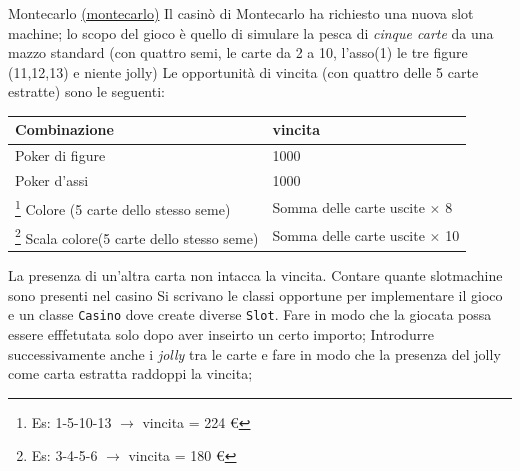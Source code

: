 \begin{esercizio}{Montecarlo \href{run:./files/java/esercizi/montecarlo/}{(montecarlo)}}
	Il casinò di Montecarlo ha richiesto una nuova slot machine; lo scopo del gioco è quello di simulare la pesca di \textit{cinque carte} da una mazzo standard (con quattro semi, le carte da 2 a 10, l’asso(1) le tre figure (11,12,13) e niente jolly)
	\vskip3mm
	Le opportunità di vincita (con quattro delle 5 carte estratte) sono le seguenti:
	\begin{center}
		\begin{tabular}{l l}
			\toprule
			Combinazione                                                                                    & vincita                                 \\
			\midrule
			Poker di figure                                                                                 & 1000 \texteuro                          \\
			Poker d’assi                                                                                    & 1000 \texteuro                          \\
			\footnote{Es: 1-5-10-13 $ \rightarrow  $ vincita = 224 €} Colore (5 carte dello stesso seme)    & Somma delle carte uscite $ \times  $ 8  \\
			\footnote{Es: 3-4-5-6 $ \rightarrow  $ vincita = 180 €} Scala colore(5 carte dello stesso seme) & Somma delle carte uscite $ \times  $ 10 \\
			\bottomrule
		\end{tabular}
	\end{center}


	La presenza di un’altra carta non intacca la vincita.
	\vskip3mm
	Contare quante slotmachine sono presenti nel casino
	\vskip3mm
	Si scrivano le classi opportune per implementare il gioco e un classe \verb|Casino| dove create diverse \verb|Slot|.
	\vskip3mm
	Fare in modo che la giocata possa essere efffetutata solo dopo aver inseirto un certo importo;
	\vskip3mm
	Introdurre successivamente anche i \textit{jolly} tra le carte e fare in modo che la presenza del jolly come carta estratta raddoppi la vincita;
\end{esercizio}


